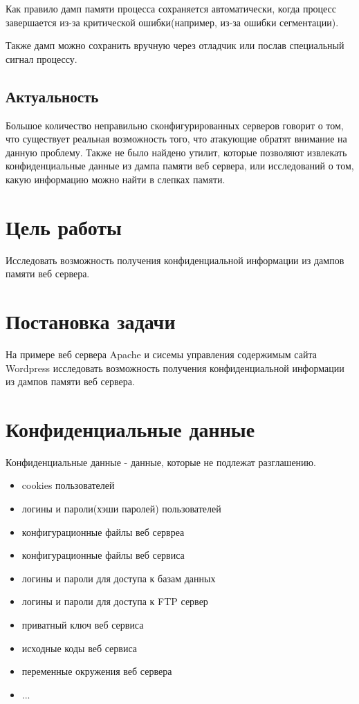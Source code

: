 \documentclass[20pt]{article}
\begin{document}
Как правило дамп памяти процесса сохраняется автоматически, когда процесс
завершается из-за критической ошибки(например, из-за ошибки сегментации).

Также дамп можно сохранить вручную через отладчик или послав специальный сигнал
процессу.

\subsection{Актуальность}
Большое количество неправильно сконфигурированных серверов говорит о том, что
существует реальная возможность того, что атакующие обратят внимание на данную
проблему. Также не было найдено утилит, которые позволяют извлекать
конфиденциальные данные из дампа памяти веб сервера, или исследований о том,
какую информацию можно найти в слепках памяти.

\newpage

\section{Цель работы}
Исследовать возможность получения конфиденциальной информации из дампов памяти веб сервера.

\newpage

\section{Постановка задачи}
На примере веб сервера Apache и сисемы управления содержимым сайта Wordpress
исследовать возможность получения конфиденциальной информации из дампов памяти
веб сервера.

\newpage

\section{Конфиденциальные данные}
Конфиденциальные данные - данные, которые не подлежат разглашению.

\begin{itemize}
  \item cookies пользователей
  \item логины и пароли(хэши паролей) пользователей
  \item конфигурационные файлы веб сервреа
  \item конфигурационные файлы веб сервиса
  \item логины и пароли для доступа к базам данных
  \item логины и пароли для доступа к FTP сервер
  \item приватный ключ веб сервиса
  \item исходные коды веб сервиса
  \item переменные окружения веб сервера
  \item ...
\end{itemize}
\end{document}
